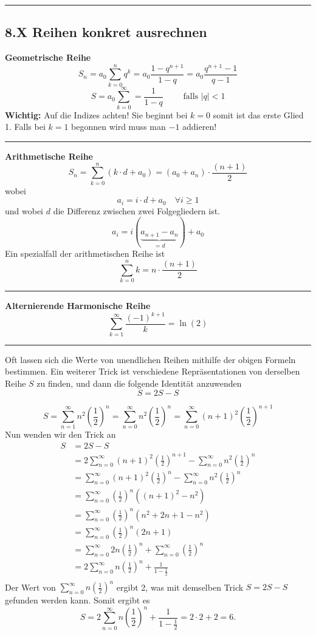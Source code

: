 \documentclass[a4paper,landscape,8pt]{extarticle}
\newcommand{\abs}[1]{\left\lvert #1 \right\rvert}
\newcommand{\sep}{\vspace{5pt}\noindent\hrule\vspace{5pt}}
\newcommand{\Wichtig}{\textbf{Wichtig: }}
\begin{document}
\begin{multicols*}{4}
\sep

\subsection{8.X Reihen konkret ausrechnen}

\textbf{Geometrische Reihe}
\[
S_n = a_0\sum_{k=0}^n q^k = a_0\frac{1-q^{n+1}}{1-q} = a_0 \frac{q^{n+1}-1}{q-1}
\]
\[
S = a_0\sum_{k=0}^\infty = \frac{1}{1-q} \qquad \text{ falls } \abs{q}<1
\]
\Wichtig Auf die Indizes achten! Sie beginnt bei $k=0$ somit ist das erste Glied
1. Falls bei $k=1$ begonnen wird muss man $-1$ addieren!

\sep

\textbf{Arithmetische Reihe}
\[
S_n = \sum_{k=0}^{n}\left(k\cdot d + a_0\right)= (a_0+a_n) \cdot \frac{(n+1)}{2}
\]
wobei
\[
a_i = i\cdot d + a_0 \quad \forall i\geq 1
\]
und wobei $d$ die Differenz zwischen zwei Folgegliedern ist.
\[
a_i = i(\underbrace{a_{n+1}-a_n}_{=d}) + a_0
\]
Ein spezialfall der arithmetischen Reihe ist
\[
\sum_{k=0}^n k = n\cdot \frac{(n+1)}{2}
\]

\sep

\textbf{Alternierende Harmonische Reihe}
\[
\sum_{k=1}^{\infty} \frac{(-1)^{k+1}}{k} = \ln(2)
\]

\sep 

\Trick Oft lassen sich die Werte von unendlichen Reihen mithilfe der obigen
Formeln bestimmen. Ein weiterer Trick ist verschiedene Repräsentationen von
derselben Reihe $S$ zu finden, und dann die folgende Identität anzuwenden
\[
S = 2S - S
\]

\begin{warmup}
\Bsp 
\[
S=\sum_{n=1}^{\infty} n^2\left(\frac{1}{2}\right)^n
=\sum_{n=0}^{\infty} n^2\left(\frac{1}{2}\right)^n
=\sum_{n=0}^{\infty} (n+1)^2\left(\frac{1}{2}\right)^{n+1}
\]
Nun wenden wir den Trick an
\begin{align*}
S &= 2S - S\\
&= 2 \sum_{n=0}^{\infty} (n+1)^2\left(\frac{1}{2}\right)^{n+1}
-\sum_{n=0}^{\infty} n^2\left(\frac{1}{2}\right)^n\\
&= \sum_{n=0}^{\infty} (n+1)^2\left(\frac{1}{2}\right)^{n}
-\sum_{n=0}^{\infty} n^2\left(\frac{1}{2}\right)^n\\
&= \sum_{n=0}^{\infty} \left(\frac{1}{2}\right)^{n} ((n+1)^2-n^2)\\
&= \sum_{n=0}^{\infty} \left(\frac{1}{2}\right)^{n} (n^2+2n+1-n^2)\\
&= \sum_{n=0}^{\infty} \left(\frac{1}{2}\right)^{n} (2n+1)\\
&= \sum_{n=0}^{\infty} 2n\left(\frac{1}{2}\right)^{n}
+\sum_{n=0}^{\infty} \left(\frac{1}{2}\right)^n\\
&= 2\sum_{n=0}^{\infty} n\left(\frac{1}{2}\right)^{n}
+\frac{1}{1-\frac{1}{2}}\\
\end{align*}
Der Wert von $\sum_{n=0}^{\infty} n\left(\frac{1}{2}\right)^{n}$ ergibt 2, was
mit demselben Trick $S=2S-S$ gefunden werden kann. Somit ergibt es
\[
S = 2\sum_{n=0}^{\infty} n\left(\frac{1}{2}\right)^{n}
+\frac{1}{1-\frac{1}{2}} = 2\cdot 2 + 2 = 6.
\]


\end{warmup}
\end{multicols*}
\end{document}
